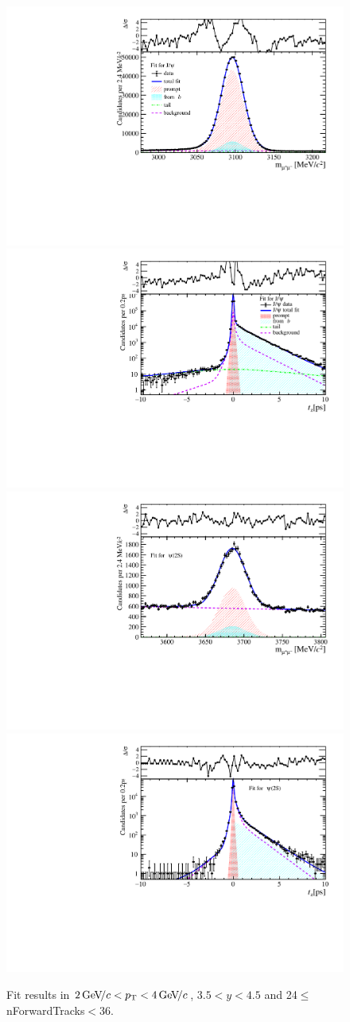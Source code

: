 \begin{figure}[H]
\begin{center}
\includegraphics[width=0.47\linewidth]{pdf/Jpsi/drawmassF/n3y3pt2.pdf}
\includegraphics[width=0.47\linewidth]{pdf/Jpsi/2DFitF/n3y3pt2.pdf}
\vspace*{-0.5cm}
\includegraphics[width=0.47\linewidth]{pdf/Psi2S/drawmassF/n3y3pt2.pdf}
\includegraphics[width=0.47\linewidth]{pdf/Psi2S/2DFitF/n3y3pt2.pdf}
\vspace*{-0.5cm}
\end{center}
\caption{Fit results in $2\text{\,Ge\kern -0.1em V\!/}c<p_{\mathrm{T}}<4\text{\,Ge\kern -0.1em V\!/}c$, $3.5<y<4.5$ and 24$\leq$nForwardTracks$<$36.}
\label{Fitn3y3pt2}
\end{figure}

